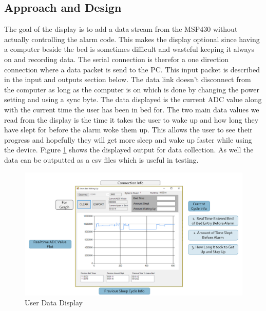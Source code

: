 \documentclass[11pt]{article}
\begin{document}
\subsection*{Approach and Design}
The goal of the display is to add a data stream from the MSP430 without actually controlling the alarm code. 
This makes the display optional since having a computer beside the bed is sometimes difficult and wasteful keeping it always on and recording data.
The serial connection is therefor a one direction connection where a data packet is send to the PC.
This input packet is described in the input and outputs section below.
The data link doesn't disconnect from the computer as long as the computer is on which is done by changing the power setting and using a sync byte.
The data displayed is the current ADC value along with the current time the user has been in bed for.
The two main data values we read from the display is the time it takes the user to wake up and how long they have slept for before the alarm woke them up. 
This allows the user to see their progress and hopefully they will get more sleep and wake up faster while using the device. 
Figure \ref{fig:UI} shows the displayed output for data collection.
As well the data can be outputted as a csv files which is useful in testing. 
 \begin{figure}[H]
 	\centering
 	\includegraphics[width = \linewidth]{UIlabeled}
 	\caption{User Data Display }
 	\label{fig:UI}
 \end{figure} 
\end{document}
